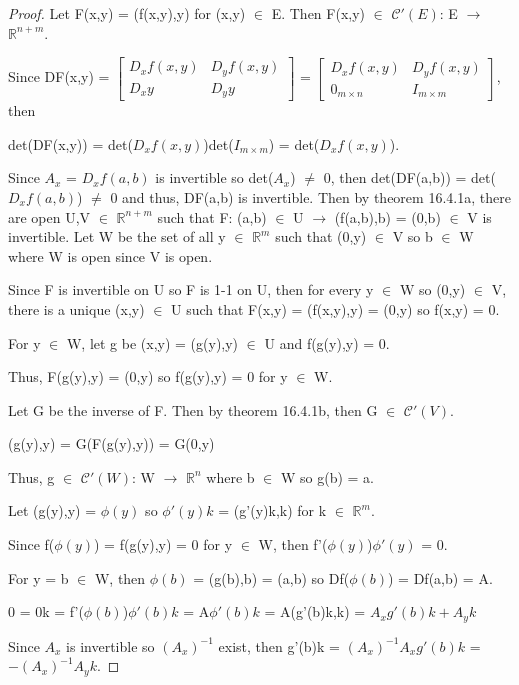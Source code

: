     \begin{proof}
        Let F(x,y) = (f(x,y),y) for (x,y) $\in$ E.
        Then F(x,y) $\in$ $\mathscr{C}'(E)$: E $\rightarrow$ $\mathbb{R}^{n+m}$.

        Since DF(x,y)
        = $\begin{bmatrix}
            D_xf(x,y) & D_yf(x,y) \\
            D_xy & D_yy
        \end{bmatrix}$
        = $\begin{bmatrix}
            D_xf(x,y) & D_yf(x,y) \\
            0_{m \times n} & I_{m \times m}
        \end{bmatrix}$, then

        det(DF(x,y)) = det($D_xf(x,y)$)det($I_{m \times m}$) = det($D_xf(x,y)$).

        Since $A_x$ = $D_xf(a,b)$ is invertible so det($A_x$) $\not =$ 0, then
        det(DF(a,b)) = det($D_xf(a,b)$) $\not =$ 0 and thus, DF(a,b) is invertible.
        Then by {\color{red} theorem 16.4.1a},
        there are open U,V $\in$ $\mathbb{R}^{n+m}$
        such that F: (a,b) $\in$ U $\rightarrow$ (f(a,b),b) = (0,b) $\in$ V
        is invertible.
        Let W be the set of all y $\in$ $\mathbb{R}^m$ such that (0,y) $\in$ V
        so b $\in$ W where W is open since V is open.

        Since F is invertible on U so F is 1-1 on U, then
        for every y $\in$ W so (0,y) $\in$ V, there is a unique (x,y) $\in$ U
        such that F(x,y) = (f(x,y),y) = (0,y) so f(x,y) = 0.

        For y $\in$ W, let g be (x,y) = (g(y),y) $\in$ U and f(g(y),y) = 0.
        
        Thus, F(g(y),y) = (0,y) so f(g(y),y) = 0 for y $\in$ W. 

        Let G be the inverse of F. Then by {\color{red} theorem 16.4.1b},
        then G $\in$ $\mathscr{C}'(V)$.

        \hspace{0.5cm}
        (g(y),y) = G(F(g(y),y)) = G(0,y)

        Thus, g $\in$ $\mathscr{C}'(W)$: W $\rightarrow$ $\mathbb{R}^n$
        where b $\in$ W so g(b) = a.

        Let (g(y),y) = $\phi(y)$ so $\phi'(y)k$ = (g'(y)k,k)
        for k $\in$ $\mathbb{R}^m$.

        Since f($\phi(y)$) = f(g(y),y) = 0 for y $\in$ W, then
        f'($\phi(y)$)$\phi'(y)$ = 0.

        For y = b $\in$ W, then $\phi(b)$ = (g(b),b) = (a,b)
        so Df($\phi(b)$) = Df(a,b) = A.

        \hspace{0.5cm}
        0 = 0k = f'($\phi(b)$)$\phi'(b)k$
        = A$\phi'(b)k$
        = A(g'(b)k,k)
        = $A_xg'(b)k + A_yk$

        Since $A_x$ is invertible so $(A_x)^{-1}$ exist, then
        g'(b)k
        = $(A_x)^{-1}A_xg'(b)k$
        = $-(A_x)^{-1}A_yk$.
    \end{proof}

